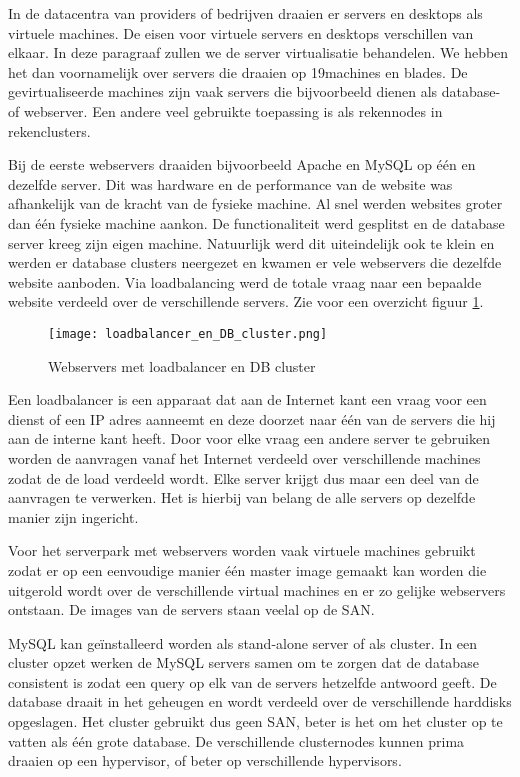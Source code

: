 In de datacentra van providers of bedrijven draaien er servers en desktops als virtuele machines. De eisen voor virtuele servers en desktops verschillen van elkaar. In deze paragraaf zullen we de server virtualisatie behandelen. We hebben het dan voornamelijk over servers die draaien op 19\inch machines en blades. De gevirtualiseerde machines zijn vaak servers die bijvoorbeeld dienen als database- of webserver. Een andere veel gebruikte toepassing is als rekennodes in rekenclusters.

Bij de eerste webservers draaiden bijvoorbeeld Apache en MySQL op \'e\'en en dezelfde server. Dit was hardware en de performance van de website was afhankelijk van de kracht van de fysieke machine. Al snel werden websites groter dan \'e\'en fysieke machine aankon. De functionaliteit werd gesplitst en de database server kreeg zijn eigen machine. Natuurlijk werd dit uiteindelijk ook te klein en werden er database clusters neergezet en kwamen er vele webservers die dezelfde website aanboden. Via loadbalancing werd de totale vraag naar een bepaalde website verdeeld over de verschillende servers. Zie voor een overzicht figuur \ref{fig:WSDB-network}.

\begin{figure}[H]
\texttt{[image: loadbalancer\_en\_DB\_cluster.png]}
\centering
\caption{Webservers met loadbalancer en DB cluster}
\label{fig:WSDB-network}
\end{figure}

Een loadbalancer is een apparaat dat aan de Internet kant een vraag voor een dienst of een IP adres aanneemt en deze doorzet naar \'e\'en van de servers die hij aan de interne kant heeft. Door voor elke vraag een andere server te gebruiken worden de aanvragen vanaf het Internet verdeeld over verschillende machines zodat de de load verdeeld wordt. Elke server krijgt dus maar een deel van de aanvragen te verwerken. Het is hierbij van belang de alle servers op dezelfde manier zijn ingericht.

Voor het serverpark met webservers worden vaak virtuele machines gebruikt zodat er op een eenvoudige manier \'e\'en master image gemaakt kan worden die uitgerold wordt over de verschillende virtual machines en er zo gelijke webservers ontstaan. De images van de servers staan veelal op de SAN.

MySQL kan ge\"installeerd worden als stand-alone server of als cluster. In een cluster opzet werken de MySQL servers samen om te zorgen dat de database consistent is zodat een query op elk van de servers hetzelfde antwoord geeft. De database draait in het geheugen en wordt verdeeld over de verschillende harddisks opgeslagen. Het cluster gebruikt dus geen SAN, beter is het om het cluster op te vatten als \'e\'en grote database. De verschillende clusternodes kunnen prima draaien op een hypervisor, of beter op verschillende hypervisors.
